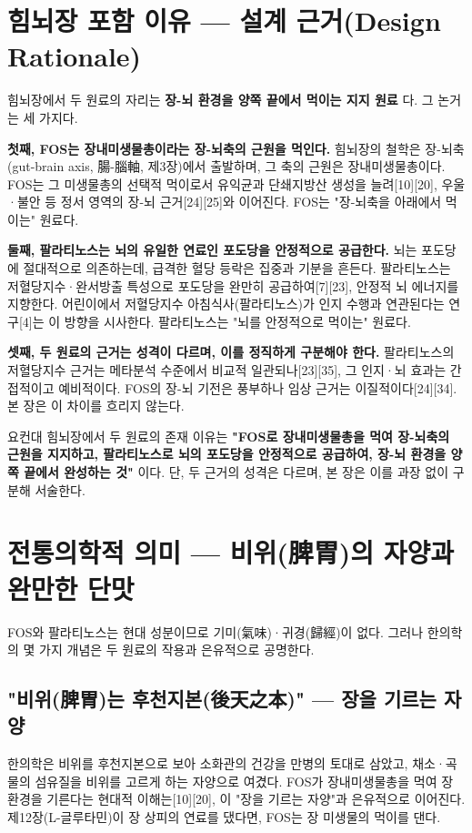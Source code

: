 \documentclass[11pt,oneside]{book}
\begin{document}
\section{힘뇌장 포함 이유 — 설계 근거(Design Rationale)}
힘뇌장에서 두 원료의 자리는 \textbf{장-뇌 환경을 양쪽 끝에서 먹이는 지지 원료} 다. 그 논거는 세 가지다.

\textbf{첫째, FOS는 장내미생물총이라는 장-뇌축의 근원을 먹인다.} 힘뇌장의 철학은 장-뇌축(gut-brain axis, 腸-腦軸, 제3장)에서 출발하며, 그 축의 근원은 장내미생물총이다. FOS는 그 미생물총의 선택적 먹이로서 유익균과 단쇄지방산 생성을 늘려[10][20], 우울·불안 등 정서 영역의 장-뇌 근거[24][25]와 이어진다. FOS는 "장-뇌축을 아래에서 먹이는" 원료다.

\textbf{둘째, 팔라티노스는 뇌의 유일한 연료인 포도당을 안정적으로 공급한다.} 뇌는 포도당에 절대적으로 의존하는데, 급격한 혈당 등락은 집중과 기분을 흔든다. 팔라티노스는 저혈당지수·완서방출 특성으로 포도당을 완만히 공급하여[7][23], 안정적 뇌 에너지를 지향한다. 어린이에서 저혈당지수 아침식사(팔라티노스)가 인지 수행과 연관된다는 연구[4]는 이 방향을 시사한다. 팔라티노스는 "뇌를 안정적으로 먹이는" 원료다.

\textbf{셋째, 두 원료의 근거는 성격이 다르며, 이를 정직하게 구분해야 한다.} 팔라티노스의 저혈당지수 근거는 메타분석 수준에서 비교적 일관되나[23][35], 그 인지·뇌 효과는 간접적이고 예비적이다. FOS의 장-뇌 기전은 풍부하나 임상 근거는 이질적이다[24][34]. 본 장은 이 차이를 흐리지 않는다.

요컨대 힘뇌장에서 두 원료의 존재 이유는 \textbf{"FOS로 장내미생물총을 먹여 장-뇌축의 근원을 지지하고, 팔라티노스로 뇌의 포도당을 안정적으로 공급하여, 장-뇌 환경을 양쪽 끝에서 완성하는 것"} 이다. 단, 두 근거의 성격은 다르며, 본 장은 이를 과장 없이 구분해 서술한다.

\section{전통의학적 의미 — 비위(脾胃)의 자양과 완만한 단맛}
FOS와 팔라티노스는 현대 성분이므로 기미(氣味)·귀경(歸經)이 없다. 그러나 한의학의 몇 가지 개념은 두 원료의 작용과 은유적으로 공명한다.

\subsection{"비위(脾胃)는 후천지본(後天之本)" — 장을 기르는 자양}
한의학은 비위를 후천지본으로 보아 소화관의 건강을 만병의 토대로 삼았고, 채소·곡물의 섬유질을 비위를 고르게 하는 자양으로 여겼다. FOS가 장내미생물총을 먹여 장 환경을 기른다는 현대적 이해는[10][20], 이 "장을 기르는 자양"과 은유적으로 이어진다. 제12장(L-글루타민)이 장 상피의 연료를 댔다면, FOS는 장 미생물의 먹이를 댄다.
\end{document}
